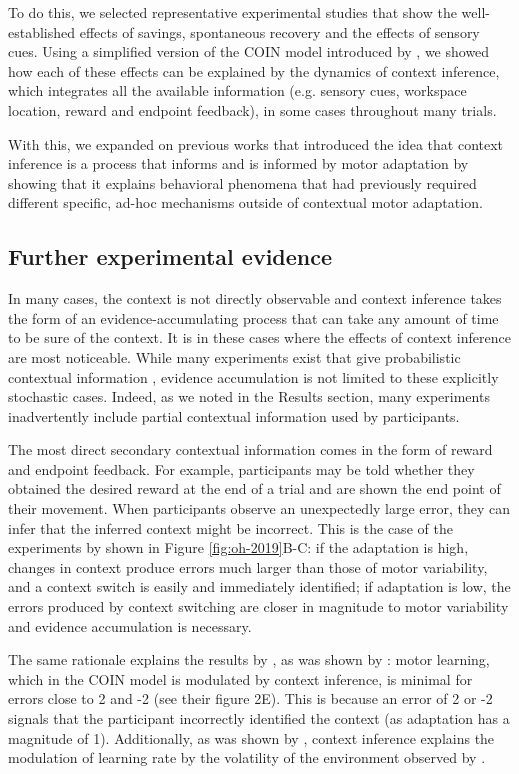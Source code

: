 \documentclass[a4paper,doc,floatsintext,natbib]{apa6}
\def \fref #1{Figure \ref{#1}}     %
\begin{document}
To do this, we selected representative experimental studies that show the well-established effects of savings, spontaneous recovery and the effects of sensory cues. Using a simplified version of the COIN model introduced by \cite{Heald_Contextual_2021}, we showed how each of these effects can be explained by the dynamics of context inference, which integrates all the available information (e.g. sensory cues, workspace location, reward and endpoint feedback), in some cases throughout many trials.

With this, we expanded on previous works that introduced the idea that context inference is a process that informs and is informed by motor adaptation by showing that it explains behavioral phenomena that had previously required different specific, ad-hoc mechanisms outside of contextual motor adaptation. 

\subsection{Further experimental evidence}
In many cases, the context is not directly observable and context inference takes the form of an evidence-accumulating process that can take any amount of time to be sure of the context. It is in these cases where the effects of context inference are most noticeable. While many experiments exist that give probabilistic contextual information \cite[e.g.][]{Scholz_uncontrolled_1999,Behrens_Learning_2007,Nassar_Dissociable_2019}, evidence accumulation is not limited to these explicitly stochastic cases. Indeed, as we noted in the Results section, many experiments inadvertently include partial contextual information used by participants.

The most direct secondary contextual information comes in the form of reward and endpoint feedback. For example, participants may be told whether they obtained the desired reward at the end of a trial and are shown the end point of their movement. When participants observe an unexpectedly large error, they can infer that the inferred context might be incorrect. This is the case of the experiments by \cite{Oh_Minimizing_2019} shown in \fref{fig:oh-2019}B-C: if the adaptation is high, changes in context produce errors much larger than those of motor variability, and a context switch is easily and immediately identified; if adaptation is low, the errors produced by context switching are closer in magnitude to motor variability and evidence accumulation is necessary.

The same rationale explains the results by \cite{Herzfeld_memory_2014}, as was shown by \cite{Heald_Contextual_2021}: motor learning, which in the COIN model is modulated by context inference, is minimal for errors close to 2 and -2 (see their figure 2E). This is because an error of 2 or -2 signals that the participant incorrectly identified the context (as adaptation has a magnitude of 1). Additionally, as was shown by \cite{Heald_Contextual_2021}, context inference explains the modulation of learning rate by the volatility of the environment observed by \cite{Herzfeld_memory_2014}.
\end{document}
